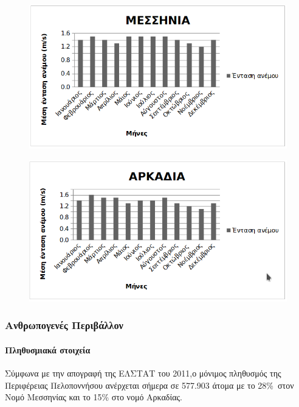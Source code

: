 \documentclass[12pt]{article}
\begin{document}
	\begin{figure} [H]
		\begin{center}
			\includegraphics [scale = 0.80] {messinia7.png}
		\end{center}
	\end{figure}
	\begin{figure} [H]
		\begin{center}
			\includegraphics [scale = 0.80] {arkadia7.png}
		\end{center}
	\end{figure}

	\subsubsection{Ανθρωπογενές Περιβάλλον}
	
	\paragraph{Πληθυσμιακά στοιχεία}
	
	Σύμφωνα με την απογραφή της ΕΛΣΤΑΤ του 2011,ο μόνιμος πληθυσμός της Περιφέρειας Πελοποννήσου ανέρχεται σήμερα σε 577.903 άτομα με το 28\% στον Νομό Μεσσηνίας και το 15\% στο νομό Αρκαδίας.
	
\end{document}
